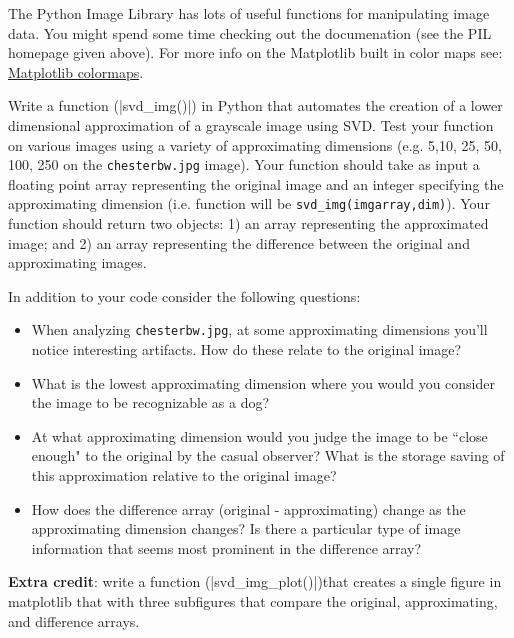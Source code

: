 The Python Image Library has lots of useful functions for manipulating image data. You might spend some time checking out the documenation (see the PIL homepage given above). For more info on the Matplotlib built in color maps see: \href{http://matplotlib.sourceforge.net/examples/pylab_examples/show_colormaps.html}{Matplotlib colormaps}.

\bigskip

\begin{assignment}
\small

Write a function (|svd_img()|) in Python that automates the creation of a lower dimensional approximation of a grayscale image using SVD.  Test your function on various images using a variety of approximating dimensions (e.g. 5,10, 25, 50, 100, 250 on the \verb|chesterbw.jpg| image).  Your function should take as input a floating point array representing the original image and an integer specifying the approximating dimension (i.e. function will be \verb|svd_img(imgarray,dim)|). Your function should return two objects: 1) an array representing the approximated image; and 2) an array representing the difference between the original and approximating images.

In addition to your code consider the following questions:

\begin{itemize}
\item When analyzing \texttt{chesterbw.jpg}, at some approximating dimensions you'll notice interesting artifacts. How do these relate to the original image? 

\item What is the lowest approximating dimension where you would you consider the image to be recognizable as a dog?
 
\item At what approximating dimension would you judge the  image to be ``close enough"  to the original by the casual observer? What is the storage saving of this approximation relative to the original image?

\item How does the difference array (original - approximating) change as the approximating dimension changes? Is there a particular type of image information that seems most prominent in the difference array?
\end{itemize}

\textbf{Extra credit}: write a function (|svd_img_plot()|)that creates a single figure in matplotlib that with three subfigures that compare the original, approximating, and difference arrays. 

\end{assignment}






